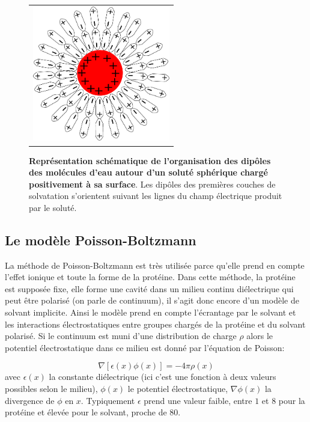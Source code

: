    \begin{figure}[!htbp]
     \centering
     \begin{tabular}{c}
       \includegraphics[width=6cm]{figure/ecrantage.pdf} &
     \end{tabular}
     
     \caption{\textbf{Représentation schématique de l'organisation des dipôles des molécules d'eau autour d'un soluté sphérique chargé positivement à sa surface}. Les dipôles des premières couches de solvatation s'orientent suivant les lignes du champ électrique produit par le soluté.}
\label{graph:ecrantage}
   \end{figure}
   
\subsection{Le modèle Poisson-Boltzmann}
La méthode de Poisson-Boltzmann est très utilisée parce qu'elle prend en compte l'effet ionique et toute la forme de la protéine. Dans cette méthode, la protéine est supposée fixe, elle forme une cavité dans un milieu continu diélectrique qui peut être polarisé (on parle de continuum), il s'agit donc encore d'un modèle de solvant implicite. Ainsi le modèle prend en compte l'écrantage par le solvant et les interactions électrostatiques entre groupes chargés de la protéine et du solvant polarisé. Si le continuum est muni d'une distribution de charge $\rho$ alors le potentiel électrostatique dans ce milieu est donné par l'équation de Poisson:

\begin{equation}
  \label{eq:poisson}
  \nabla [ \epsilon(x) \phi(x)] = - 4 \pi \rho(x)   
\end{equation}
avec $\epsilon(x)$ la constante diélectrique (ici c'est une fonction à deux valeurs possibles selon le milieu), $\phi (x)$ le potentiel électrostatique, $\nabla \phi(x)$ la divergence de $\phi$ en $x$.
Typiquement $\epsilon$ prend une valeur faible, entre $1$ et $8$ pour la protéine et élevée pour le solvant, proche de $80$.

